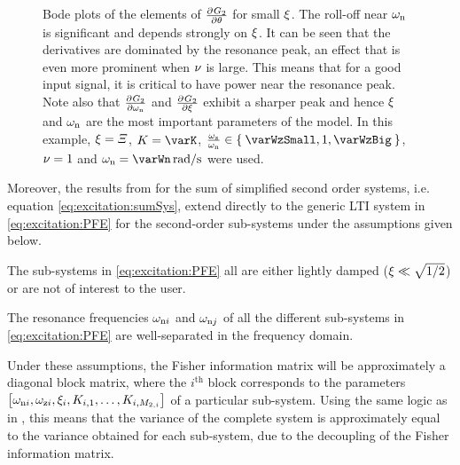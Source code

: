 \begin{figure}
  \centering
  \setlength{}
  \setlength\figureheight{\figurewidth}
  
  \caption[Derivatives of a second-order sub-system towards each of its parameters.]{Bode plots of the elements of $\PartialDerivative{G_2}{\theta}$ for small $\damping$. 
  The roll-off near $\wn$ is significant and depends strongly on $\damping$.
  It can be seen that the derivatives are dominated by the resonance peak, an effect that is even more prominent when $\multiplicity$ is large.
  This means that for a good input signal, it is critical to have power near the resonance peak. 
  Note also that $\PartialDerivative{G_2}{\wn}$ and $\PartialDerivative{G_2}{\damping}$ exhibit a sharper peak and hence $\damping$ and $\wn$ are the most important parameters of the model.
  In this example, $\damping = \varXi$, $K = \varK$, $\frac{\wz}{\wn} \in \Set{\varWzSmall, 1, \varWzBig}$, $\multiplicity=1$ and $\wn = \varWn \unit{rad/s}$ were used.
}
\label{fig:excitation:derivatives}
\end{figure}

Moreover, the results from  for the sum of simplified second order systems, i.e. equation \eqref{eq:excitation:sumSys}, extend directly to the generic \gls{LTI} system in \eqref{eq:excitation:PFE} for the second-order sub-systems under the assumptions given below.

\begin{assumption}
The sub-systems in \eqref{eq:excitation:PFE} all are either lightly damped ($\damping \ll \sqrt{1/2}$) or are not of interest to the user.
\end{assumption}

\begin{assumption}
The resonance frequencies $\wn[i]$ and $\wn[j]$ of all the different sub-systems in \eqref{eq:excitation:PFE} are well-separated in the frequency domain.
\end{assumption}

Under these assumptions, the Fisher information matrix will be approximately a diagonal block matrix, where the $i^{\text{th}}$ block corresponds to the parameters $\left[\wn[i], \wz[i], \damping[i], \dc[i,1], \ldots, \dc[i,M_{2,i}] \right]$ of a particular sub-system.
Using the same logic as in , this means that the variance of the complete system is approximately equal to the variance obtained for each sub-system, due to the decoupling of the Fisher information matrix.

